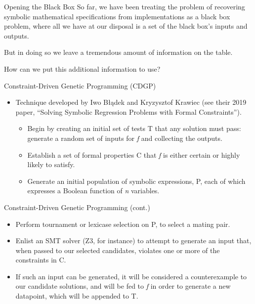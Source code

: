 \documentclass[presentation]{beamer}
\begin{document}
\begin{frame}[label={sec:org2843ee4}]{Opening the Black Box}
So far, we have been treating the problem of recovering symbolic mathematical specifications from implementations as a \alert{black box} problem, where all we have at our disposal is a set of the black box's inputs and outputs.

But in doing so we leave a tremendous amount of information on the table.

How can we put this additional information to use?
\end{frame}


\begin{frame}[label={sec:org2236ccb}]{Constraint-Driven Genetic Programming (CDGP)}
\begin{itemize}
\item Technique developed by Iwo Błądek and Kryzysztof Krawiec (see their 2019 paper, ``Solving Symbolic Regression Problems with Formal Constraints'').
\begin{itemize}
\item Begin by creating an initial set of tests \alert{T} that any solution must pass: generate a random set of inputs for \emph{f} and collecting the outputs.
\item Establish a set of formal properties \alert{C} that \emph{f} is either certain or highly likely to satisfy.
\item Generate an initial population of symbolic expressions, \alert{P}, each of which expresses a Boolean function of \emph{n} variables.
\end{itemize}
\end{itemize}
\end{frame}

\begin{frame}[label={sec:org037cffe}]{Constraint-Driven Genetic Programming (cont.)}
\begin{itemize}
\item Perform tournament or lexicase selection on \alert{P}, to select a mating pair.
\item Enlist an SMT solver (Z3, for instance) to attempt to generate an input that, when passed to our selected candidates, violates one or more of the constraints in \alert{C}.
\item If such an input can be generated, it will be considered a counterexample to our candidate solutions, and will be fed to \emph{f} in order to generate a new datapoint, which will be appended to \alert{T}.
\end{itemize}
\end{frame}
\end{document}

